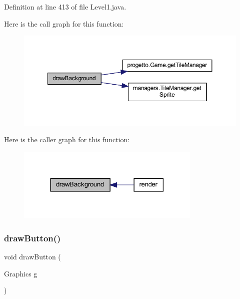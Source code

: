 Definition at line 413 of file Level1.\+java.

Here is the call graph for this function\+:
\nopagebreak
\begin{figure}[H]
\begin{center}
\leavevmode
\includegraphics[width=350pt]{classscenes_1_1_level1_a62bcb07be9e39896e5837a9d396e7235_cgraph}
\end{center}
\end{figure}
Here is the caller graph for this function\+:\nopagebreak
\begin{figure}[H]
\begin{center}
\leavevmode
\includegraphics[width=249pt]{classscenes_1_1_level1_a62bcb07be9e39896e5837a9d396e7235_icgraph}
\end{center}
\end{figure}
\mbox{\label{classscenes_1_1_level1_a65768678909bc0512c6cb9780709ad38}} 
\subsubsection{\texorpdfstring{draw\+Button()}{drawButton()}}
{\footnotesize\ttfamily void draw\+Button (\begin{DoxyParamCaption}\item[{Graphics}]{g }\end{DoxyParamCaption})\hspace{0.3cm}{\ttfamily [private]}}



